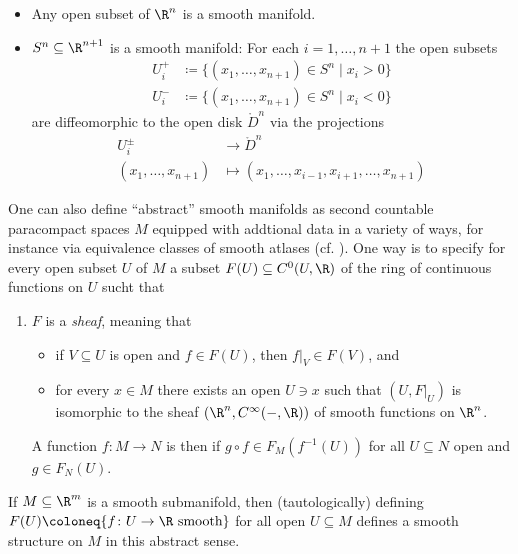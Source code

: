 \begin{example}
	\leavevmode
	\begin{itemize}
		\item Any open subset of $\R^n$ is a smooth manifold.
		\item $S^n \subseteq \R^{n + 1}$ is a smooth manifold:
			For each $i = 1, \ldots, n + 1$ the open subsets 
			\begin{align*}
				U^+_i &\coloneq \{(x_1, \ldots, x_{n + 1}) \in S^n \mid x_i > 0 \} \\
				U^-_i &\coloneq \{(x_1, \ldots, x_{n + 1}) \in S^n \mid x_i < 0 \} 
			\end{align*}
			are diffeomorphic to the open disk $\mathring{D}^n$ via the projections
			\begin{align*}
				U^\pm_i &\to \mathring{D}^n \\
				(x_1, \ldots, x_{n + 1}) &\mapsto (x_1, \ldots, x_{i - 1}, x_{i + 1}, \ldots, x_{n + 1})
			\end{align*}
	\end{itemize}
\end{example}
\begin{remark}
	One can also define \enquote{abstract} smooth manifolds as second countable paracompact spaces $M$ equipped with addtional data in a variety of ways, for instance via equivalence classes of smooth atlases (cf. \cite[Ch. 1]{lee_introduction_2012}).
	One way is to specify for every open subset $U$ of $M$ a subset $F(U) \subseteq C^0(U, \R)$ of the ring of continuous functions on $U$ sucht that 
	\begin{enumerate}
		\item $F$ is a \emph{sheaf}, meaning that
			\begin{itemize}
				\item if $V \subseteq U$ is open and $f \in F(U)$, then $f|_V \in F(V)$, and 
				\item for every $x \in M$ there exists an open $U \ni x$ such that $(U, F|_U)$ is isomorphic to the sheaf $(\R^n, C^\infty({{-}}, \R))$ of smooth functions on $\R^n$.
			\end{itemize}
			A function $f\colon M \to N$ is then  if $g \circ f \in F_M(f^{-1}(U))$ for all $U \subseteq N$ open and $g \in F_N(U)$.
	\end{enumerate}
\end{remark}
If $M \subseteq \R^m$ is a smooth submanifold, then (tautologically) defining $F(U) \coloneq \{f\colon U \to \R \text{ smooth}\}$ for all open $U \subseteq M$ defines a smooth structure on $M$ in this abstract sense.
